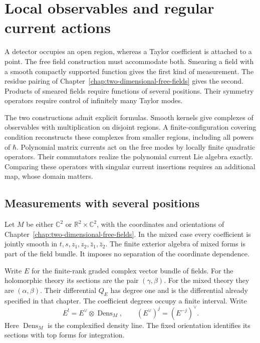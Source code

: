 \chapter{Local observables and regular current actions}
\label{chap:current-actions-local-observables}

A detector occupies an open region, whereas a Taylor coefficient is
attached to a point. The free field construction must accommodate both.
Smearing a field with a smooth compactly supported function gives the
first kind of measurement. The residue pairing of
Chapter~\ref{chap:two-dimensional-free-fields} gives the second.
Products of smeared fields require functions of several positions.
Their symmetry operators require control of infinitely many Taylor modes.

The two constructions admit explicit formulas. Smooth kernels give
complexes of observables with multiplication on disjoint regions.
A finite-configuration covering condition reconstructs these complexes
from smaller regions, including all powers of $\hbar$.
Polynomial matrix currents act on the free modes by locally finite
quadratic operators. Their commutators realize the polynomial current
Lie algebra exactly. Comparing these operators with singular current
insertions requires an additional map, whose domain matters.

\section{Measurements with several positions}
\label{sec:clo-smooth-kernels}

Let $M$ be either $\mathbb C^2$ or
$\mathbb R^2\times\mathbb C^2$, with the coordinates and orientations
of Chapter~\ref{chap:two-dimensional-free-fields}.
In the mixed case every coefficient is jointly smooth in
$t,s,z_1,z_2,\bar z_1,\bar z_2$.
The finite exterior algebra of mixed forms is part of the field bundle.
It imposes no separation of the coordinate dependence.

Write $E$ for the finite-rank graded complex vector bundle of fields.
For the holomorphic theory its sections are the pair $(\gamma,\beta)$.
For the mixed theory they are $(\alpha,\beta)$.
Their differential $Q_E$ has degree one and is the differential already
specified in that chapter. The coefficient degrees occupy a finite interval.
Write
\[
 E^!=E^\vee\otimes\operatorname{Dens}_M,
 \qquad (E^\vee)^j=(E^{-j})^\vee.
\]
Here $\operatorname{Dens}_M$ is the complexified density line.
The fixed orientation identifies its sections with top forms for integration.


